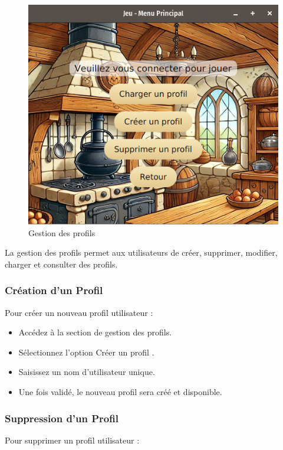 \begin{figure}[h]
    \centering
    \includegraphics[width=15cm]{../Annexe/Screen/Profils.png}
    \caption{Gestion des profils}
\end{figure}

La gestion des profils permet aux utilisateurs de créer, supprimer, modifier, charger et consulter des profils.

\subsubsection{Création d'un Profil}

Pour créer un nouveau profil utilisateur :

\begin{itemize}
  \item Accédez à la section de gestion des profils.
  \item Sélectionnez l'option \og Créer un profil \fg.
  \item Saisissez un nom d'utilisateur unique.
  \item Une fois validé, le nouveau profil sera créé et disponible.
\end{itemize}

\subsubsection{Suppression d'un Profil}

Pour supprimer un profil utilisateur :


